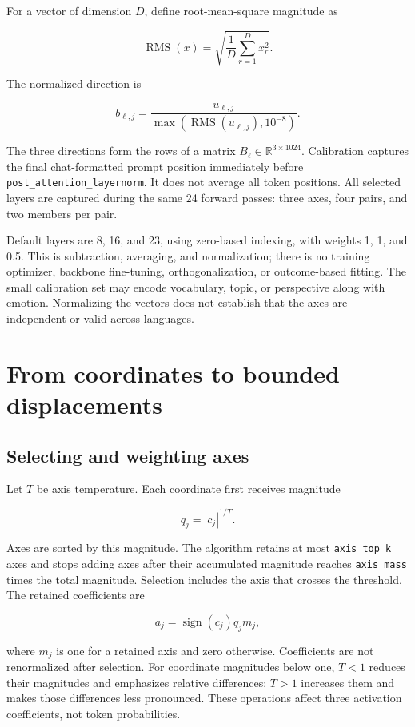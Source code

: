 \documentclass[manuscript,screen,nonacm]{acmart}
\begin{document}
For a vector of dimension \(D\), define root-mean-square magnitude as

\[
\operatorname{RMS}(x)=\sqrt{\frac1D\sum_{r=1}^{D}x_r^2}.
\]

The normalized direction is

\[
b_{\ell,j}=\frac{u_{\ell,j}}
{\max(\operatorname{RMS}(u_{\ell,j}),10^{-8})}.
\]

The three directions form the rows of a matrix
\(B_\ell\in\mathbb{R}^{3\times1024}\). Calibration captures the final
chat-formatted prompt position immediately before
\nolinkurl{post_attention_layernorm}. It does not average all token
positions. All selected layers are captured during the same 24 forward
passes: three axes, four pairs, and two members per pair.

Default layers are 8, 16, and 23, using zero-based indexing, with
weights 1, 1, and 0.5. This is subtraction, averaging, and
normalization; there is no training optimizer, backbone fine-tuning,
orthogonalization, or outcome-based fitting. The small calibration set
may encode vocabulary, topic, or perspective along with emotion.
Normalizing the vectors does not establish that the axes are independent
or valid across languages.



\section{From coordinates to bounded
displacements}\label{from-coordinates-to-bounded-displacements}

\subsection{Selecting and weighting
axes}\label{selecting-and-weighting-axes}

Let \(T\) be axis temperature. Each coordinate first receives magnitude

\[
q_j=|c_j|^{1/T}.
\]

Axes are sorted by this magnitude. The algorithm retains at most
\nolinkurl{axis_top_k} axes and stops adding axes after their accumulated
magnitude reaches \nolinkurl{axis_mass} times the total magnitude.
Selection includes the axis that crosses the threshold. The retained
coefficients are

\[
a_j=\operatorname{sign}(c_j)q_jm_j,
\]

where \(m_j\) is one for a retained axis and zero otherwise.
Coefficients are not renormalized after selection. For coordinate
magnitudes below one, \(T<1\) reduces their magnitudes and emphasizes
relative differences; \(T>1\) increases them and makes those differences
less pronounced. These operations affect three activation coefficients,
not token probabilities.
\end{document}
